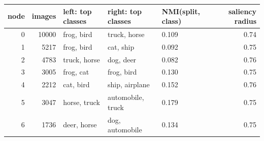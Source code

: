 \begin{tabular}{rrlllr}
\toprule
node & images & left: top classes & right: top classes & NMI(split, class) & saliency radius \\
\midrule
0 & 10000 & frog, bird & truck, horse & 0.109 & 0.74 \\
1 & 5217 & frog, bird & cat, ship & 0.092 & 0.75 \\
2 & 4783 & truck, horse & dog, deer & 0.082 & 0.76 \\
3 & 3005 & frog, cat & frog, bird & 0.130 & 0.75 \\
4 & 2212 & cat, bird & ship, airplane & 0.152 & 0.76 \\
5 & 3047 & horse, truck & automobile, truck & 0.179 & 0.75 \\
6 & 1736 & deer, horse & dog, automobile & 0.134 & 0.75 \\
\bottomrule
\end{tabular}
